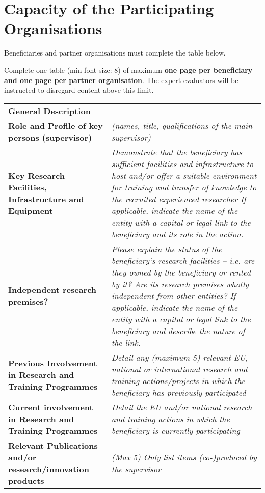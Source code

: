 \newpage
\section{Capacity of the Participating Organisations}
\label{sec:capacities}

Beneficiaries and partner organisations must complete the table below.

\medskip\noindent
Complete one table (min font size: 8) of maximum \textbf{one page per beneficiary and one page per partner organisation}. 
The expert evaluators will be instructed to disregard content above this limit. 
\vspace{\baselineskip}


\begin{table}[h!]
	{\fontsize{8bp}{1em}\selectfont %
		\noindent\begin{tabular}{|>{\raggedright}p{}|p{}|}\hline
			\multicolumn{2}{|l|}{\cellcolor{gray!50}\textbf{Beneficiary X}} \\\hline
			\textbf{General Description} &
			
			\\\hline
			\textbf{Role and Profile of key persons (supervisor)} &
			{\em (names, title, qualifications of the main supervisor)}
			{\em }
			\\\hline
			\textbf{Key Research Facilities, Infrastructure and Equipment} &
			{\em Demonstrate that the beneficiary has sufficient facilities and infrastructure to host and/or offer a suitable environment for training and transfer of knowledge to the recruited experienced researcher
				If applicable, indicate the name of the entity with a capital or legal link to the beneficiary and its role in the action.}
			\\\hline
			\textbf{Independent research premises?} &
			{\em Please explain the status of the beneficiary's research facilities – i.e. are they owned by the beneficiary or rented by it? Are its research premises wholly independent from other entities?
				If applicable, indicate the name of the entity with a capital or legal link to the beneficiary and describe the nature of the link.}
			\\\hline
			\textbf{Previous Involvement in Research and Training Programmes} &
			{\em Detail any (maximum 5) relevant EU, national or international research and training actions/projects in which the beneficiary has previously participated}
			\\\hline
			\textbf{Current involvement in Research and Training Programmes} &
			{\em Detail the EU and/or national research and training actions in which the beneficiary is currently participating}
			\\\hline
			\textbf{Relevant Publications and/or research/innovation products} &
			{\em (Max 5) Only list items (co-)produced by the supervisor}
			\\\hline
	\end{tabular}}
\end{table}

